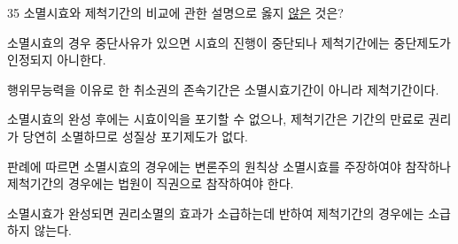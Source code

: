 \begin{question}{35}
소멸시효와 제척기간의 비교에 관한 설명으로 옳지 \uline{않은} 것은?
\begin{choices}
  \item 소멸시효의 경우 중단사유가 있으면 시효의 진행이 중단되나 제척기간에는 중단제도가 인정되지 아니한다.
  \item 행위무능력을 이유로 한 취소권의 존속기간은 소멸시효기간이 아니라 제척기간이다.
  \item 소멸시효의 완성 후에는 시효이익을 포기할 수 없으나, 제척기간은 기간의 만료로 권리가 당연히 소멸하므로 성질상 포기제도가 없다.
  \item 판례에 따르면 소멸시효의 경우에는 변론주의 원칙상 소멸시효를 주장하여야 참작하나 제척기간의 경우에는 법원이 직권으로 참작하여야 한다.
  \item 소멸시효가 완성되면 권리소멸의 효과가 소급하는데 반하여 제척기간의 경우에는 소급하지 않는다.
\end{choices}
\end{question}
